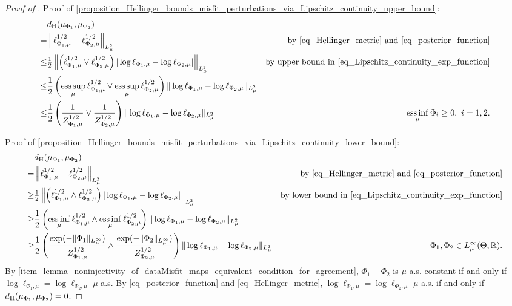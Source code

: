 \documentclass[a4paper]{scrartcl}
\theoremstyle{definition}
\numberwithin{equation}{section}
\newcommand{\R}{\mathbb{R}}
\DeclareMathOperator*{\essinf}{ess\,inf}
\DeclareMathOperator*{\esssup}{ess\,sup}
\newcommand{\abs}[1]{\vert #1\vert}
\newcommand{\norm}[1]{\Vert #1 \Vert}
\newcommand{\Norm}[1]{\left\Vert #1 \right\Vert}
\newcommand{\Hel}[0]{\textup{H}}
\begin{document}
\HellingerboundsMisfitperturbationsLipschitz*
\begin{proof}[Proof of ]
Proof of \cref{proposition_Hellinger_bounds_misfit_perturbations_via_Lipschitz_continuity_upper_bound}:
 \begin{align*}
  &d_{\Hel}(\mu_{\Phi_1},\mu_{\Phi_2})
  \\
  = &\Norm{\ell_{\Phi_1,\mu}^{1/2}-\ell_{\Phi_2,\mu}^{1/2}}_{L^2_\mu} & \text{by \eqref{eq_Hellinger_metric} and  \eqref{eq_posterior_function}}
  \\
  \leq &  \tfrac{1}{2}\Norm{ \left(\ell_{\Phi_1,\mu}^{1/2}\vee \ell_{\Phi_2,\mu}^{1/2}\right)\abs{\log \ell_{\Phi_1,\mu}-\log\ell_{\Phi_2,\mu}}}_{L^2_\mu} & \text{by upper bound in \eqref{eq_Lipschitz_continuity_exp_function}}
  \\
  \leq & \frac{1}{2}\left(\esssup_\mu \ell_{\Phi_1,\mu}^{1/2}\vee \esssup_\mu \ell_{\Phi_2,\mu}^{1/2}\right)\norm{\log \ell_{\Phi_1,\mu}-\log\ell_{\Phi_2,\mu}}_{L^2_\mu}
  \\
  \leq & \frac{1}{2}\left(\frac{1}{Z_{\Phi_1,\mu}^{1/2}}\vee\frac{1}{Z_{\Phi_2,\mu}^{1/2}}\right)\norm{\log \ell_{\Phi_1,\mu}-\log\ell_{\Phi_2,\mu}}_{L^2_\mu} & \essinf_\mu\Phi_i\geq 0,\ i=1,2.
 \end{align*}

Proof of \cref{proposition_Hellinger_bounds_misfit_perturbations_via_Lipschitz_continuity_lower_bound}: 
 \begin{align*}
  &d_{\Hel}(\mu_{\Phi_1},\mu_{\Phi_2})
  \\
  = &\Norm{\ell_{\Phi_1,\mu}^{1/2}-\ell_{\Phi_2,\mu}^{1/2}}_{L^2_\mu} & \text{by \eqref{eq_Hellinger_metric} and  \eqref{eq_posterior_function}}
  \\
  \geq & \tfrac{1}{2}\Norm{ \left(\ell_{\Phi_1,\mu}^{1/2}\wedge \ell_{\Phi_2,\mu}^{1/2}\right)\abs{\log \ell_{\Phi_1,\mu}-\log\ell_{\Phi_2,\mu}}}_{L^2_\mu} & \text{by lower bound in \eqref{eq_Lipschitz_continuity_exp_function}}
  \\
  \geq & \frac{1}{2}\left(\essinf_\mu \ell_{\Phi_1,\mu}^{1/2}\wedge \essinf_\mu \ell_{\Phi_2,\mu}^{1/2}\right)\norm{\log \ell_{\Phi_1,\mu}-\log\ell_{\Phi_2,\mu}}_{L^2_\mu}
  \\
  \geq & \frac{1}{2}\left(\frac{\exp(-\norm{\Phi_1}_{L^\infty_\mu})}{Z_{\Phi_1,\mu}^{1/2}}\wedge\frac{\exp(-\norm{\Phi_2}_{L^\infty_\mu})}{Z_{\Phi_2,\mu}^{1/2}}\right)\norm{\log \ell_{\Phi_1,\mu}-\log\ell_{\Phi_2,\mu}}_{L^2_\mu} & \Phi_1,\Phi_2\in L^\infty_\mu(\Theta,\R).
 \end{align*}
  By \ref{item_lemma_noninjectivity_of_dataMisfit_maps_equivalent_condition_for_agreement}, $\Phi_1-\Phi_2$ is $\mu$-a.s. constant if and only if $\log\ell_{\Phi_1,\mu}=\log\ell_{\Phi_2,\mu}$ $\mu$-a.s.
  By \eqref{eq_posterior_function} and \eqref{eq_Hellinger_metric}, $\log\ell_{\Phi_1,\mu}=\log\ell_{\Phi_2,\mu}$ $\mu$-a.s. if and only if $d_{\Hel}(\mu_{\Phi_1},\mu_{\Phi_2})=0$.
\end{proof}
\end{document}
